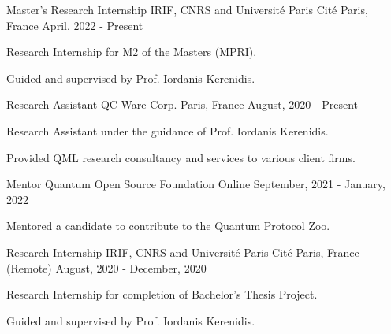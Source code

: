 

\begin{cventries}

  \cventry
    {Master's Research Internship} %
    {IRIF, CNRS and  Université Paris Cité} %
    {Paris, France} %
    {April, 2022 - Present} %
    {
      \begin{cvitems} %
        \item {Research Internship for M2 of the Masters (MPRI).}
        \item {Guided and supervised by Prof. Iordanis Kerenidis.}
      \end{cvitems}
    }

  \cventry
    {Research Assistant} %
    {QC Ware Corp.} %
    {Paris, France} %
    {August, 2020 - Present} %
    {
      \begin{cvitems} %
        \item {Research Assistant under the guidance of Prof. Iordanis Kerenidis.}
        \item {Provided QML research consultancy and services to various client firms.}
      \end{cvitems}
    }

  \cventry
    {Mentor} %
    {Quantum Open Source Foundation} %
    {Online} %
    {September, 2021 - January, 2022} %
    {
      \begin{cvitems} %
        \item {Mentored a candidate to contribute to the Quantum Protocol Zoo.}
      \end{cvitems}
    }

  \cventry
    {Research Internship} %
    {IRIF, CNRS and  Université Paris Cité} %
    {Paris, France (Remote)} %
    {August, 2020 - December, 2020} %
    {
      \begin{cvitems} %
        \item {Research Internship for completion of Bachelor's Thesis Project.}
        \item {Guided and supervised by Prof. Iordanis Kerenidis.}
      \end{cvitems}
    }


\end{cventries}
